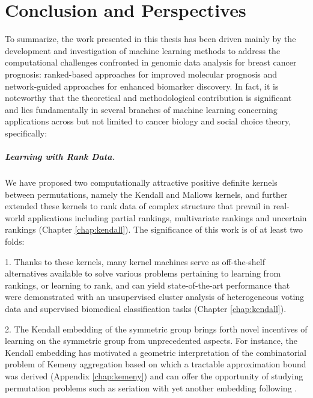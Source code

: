 \chapter{Conclusion and Perspectives}
\label{chap:conclusion}

To summarize, the work presented in this thesis has been driven mainly by the development and investigation of machine learning methods to address the computational challenges confronted in genomic data analysis for breast cancer prognosis: ranked-based approaches for improved molecular prognosis and network-guided approaches for enhanced biomarker discovery. In fact, it is noteworthy that the theoretical and methodological contribution is significant and lies fundamentally in several branches of machine learning concerning applications across but not limited to cancer biology and social choice theory, specifically:


\paragraph{Learning with Rank Data.}

We have proposed two computationally attractive positive definite kernels between permutations, namely the Kendall and Mallows kernels, and further extended these kernels to rank data of complex structure that prevail in real-world applications including partial rankings, multivariate rankings and uncertain rankings (Chapter \ref{chap:kendall}). The significance of this work is of at least two folds: 
\begin{bulletList}
\item[1.] Thanks to these kernels, many kernel machines serve as off-the-shelf alternatives available to solve various problems pertaining to learning from rankings, or learning to rank, and can yield state-of-the-art performance that were demonstrated with an unsupervised cluster analysis of heterogeneous voting data and supervised biomedical classification tasks (Chapter \ref{chap:kendall}).
\item[2.] The Kendall embedding of the symmetric group brings forth novel incentives of learning on the symmetric group from unprecedented aspects. For instance, the Kendall embedding has motivated a geometric interpretation of the combinatorial problem of Kemeny aggregation based on which a tractable approximation bound was derived (Appendix \ref{chap:kemeny}) and can offer the opportunity of studying permutation problems such as seriation with yet another embedding following \cite{Fogel2013Convex, Lim2014Beyond}.
\end{bulletList}


